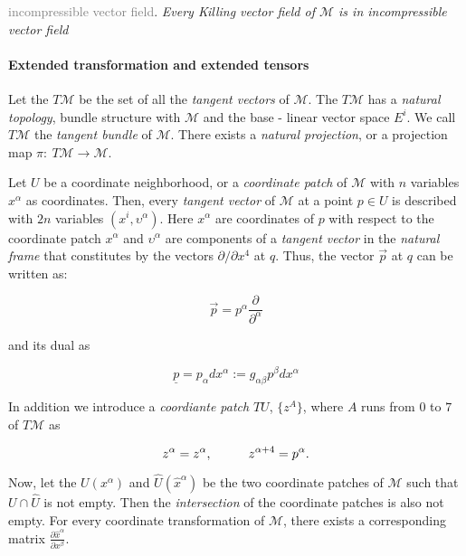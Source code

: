 \textcolor{gray}{incompressible vector field}.
\textit{Every Killing vector field of $\mathcal{M}$ is in incompressible vector field}


\paragraph{Extended transformation and extended tensors}



Let the $T\mathcal{M}$ be the set of all the \textit{tangent vectors} of $\mathcal{M}$. 
The $T\mathcal{M}$ has a \textit{natural topology}, bundle structure with $\mathcal{M}$ and the base - linear vector space $E^i$. 
We call $T\mathcal{M}$ the \textit{tangent bundle} of $\mathcal{M}$. 
There exists a \textit{natural projection}, or a projection map $\pi:\: T\mathcal{M}\rightarrow\mathcal{M}$.

Let $U$ be a coordinate neighborhood, or a \textit{coordinate patch} of $\mathcal{M}$ with $n$ variables $x^{\alpha}$ as coordinates. 
Then, every \textit{tangent vector} of $\mathcal{M}$ at a point $p\in U$ is described with $2n$ variables $(x^i,\upsilon^{\alpha})$. Here $x^{\alpha}$ are coordinates of $p$ with respect to the coordinate patch ${x^{\alpha}}$ and $\upsilon^{\alpha}$ are components of a \textit{tangent vector} in the \textit{natural frame} that constitutes by the vectors $\partial/\partial x^4$ at $q$. Thus, the vector $\vec{p}$ at $q$ can be written as:

\begin{equation}
\vec{p} = p^{\alpha}\frac{\partial}{\partial^{\alpha}}
\end{equation}

and its dual as 

\begin{equation}
\underline{p} = p_{\alpha}dx^{\alpha}:=g_{\alpha\beta}p^{\beta}dx^{\alpha}
\end{equation}

In addition we introduce a \textit{coordiante patch} $TU$, $\{z^A\}$, where $A$ runs from $0$ to $7$ of $T\mathcal{M}$ as 

\begin{equation}
z^{\alpha} = z^{\alpha}, \hspace{10mm} z^{\alpha+4} = p^{\alpha}.
\end{equation}

Now, let the $U(x^{\alpha})$ and $\hat{U}(\hat{x}^{\alpha})$ be the two coordinate patches of $\mathcal{M}$ such that $U\cap\hat{U}$ is not empty. 
Then the \textit{intersection} of the coordinate patches is also not empty. 
For every coordinate transformation of $\mathcal{M}$, there exists a corresponding matrix $\frac{\partial \hat{x}^{\alpha}}{\partial x^{\beta}}$.

